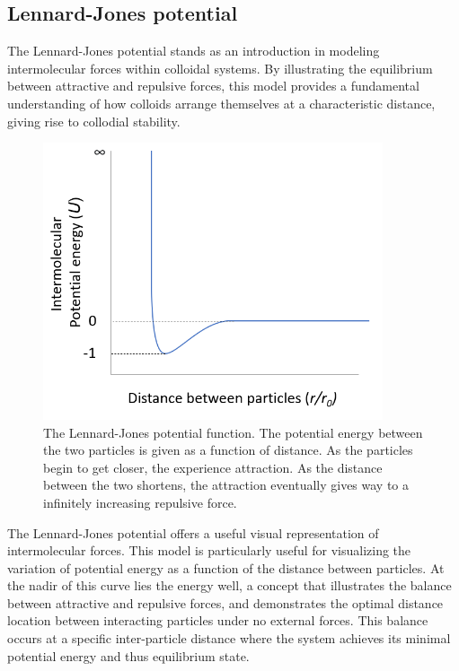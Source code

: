 \subsection{Lennard-Jones potential} %

The Lennard-Jones potential stands as an introduction in modeling intermolecular forces within colloidal systems. By illustrating the equilibrium between attractive and repulsive forces, this model provides a fundamental understanding of how colloids arrange themselves at a characteristic distance, giving rise to collodial stability.

\begin{figure}[h!!]     %
        \begin{center}
          \includegraphics[width=100mm]{chapter1/Lennard's potato.PNG}
\end{center}
\caption{The Lennard-Jones potential function. The potential energy between the two particles is given as a function of distance. As the particles begin to get closer, the experience attraction. As the distance between the two shortens, the attraction eventually gives way to a infinitely increasing repulsive force.}
\label{fig:potato}                 %
\end{figure}

The Lennard-Jones potential offers a useful visual representation of intermolecular forces. This model is particularly useful for visualizing the variation of potential energy as a function of the distance between particles. At the nadir of this curve lies the energy well, a concept that illustrates the balance between attractive and repulsive forces, and demonstrates the optimal distance location between interacting particles under no external forces. This balance occurs at a specific inter-particle distance where the system achieves its minimal potential energy and thus equilibrium state.

